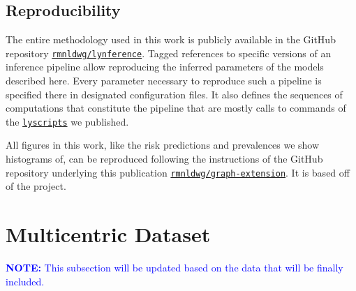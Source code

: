 \documentclass[twocolumn]{aastex631}
\newcommand{\rl}[1]{{\textcolor{blue}{#1}}}
\begin{document}
\subsection{Reproducibility}
\label{subsec:complete_model:reproducibility}

The entire methodology used in this work is publicly available in the GitHub repository \href{https://github.com/rmnldwg/lynference}{\texttt{rmnldwg/lynference}}. Tagged references to specific versions of an inference pipeline allow reproducing the inferred parameters of the models described here. Every parameter necessary to reproduce such a pipeline is specified there in designated configuration files. It also defines the sequences of computations that constitute the pipeline that are mostly calls to commands of the \href{https://pypi.org/project/lyscripts/}{\texttt{lyscripts}} we published.

All figures in this work, like the risk predictions and prevalences we show histograms of, can be reproduced following the instructions of the GitHub repository underlying this publication \href{\GitHubURL}{\texttt{rmnldwg/graph-extension}}. It is based off of the \showyourwork project.



\section{Multicentric Dataset}
\label{sec:data}

\rl{\textbf{NOTE:} This subsection will be updated based on the data that will be finally included.}

\begin{table}
    \centering
    \caption{Prevalence of involvement patterns in the multi-centric dataset. An involvement pattern is characterized by the state of the six \glspl{lnl}: A red dot means the \gls{lnl} was reported to be metastatic, a green dot means it was determined to be healthy and a question mark means that the prevalence was marginalized over the state of this \gls{lnl}.}
    \label{table:data_prevalence}
\end{table}

\end{document}
